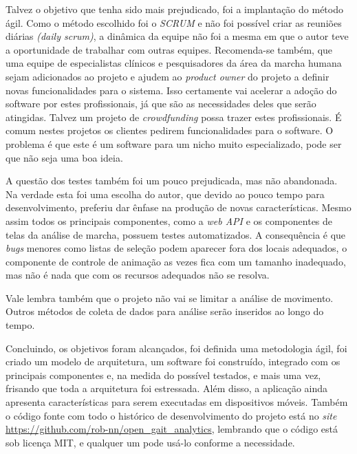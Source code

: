 Talvez o objetivo que tenha sido mais prejudicado, foi a implantação do método ágil. 
Como o método escolhido foi o \emph{SCRUM} e não foi possível criar as reuniões diárias \emph{(daily scrum)}, a dinâmica da equipe não foi a mesma em que o autor teve a oportunidade de trabalhar com outras equipes.
Recomenda-se também, que uma equipe de especialistas clínicos e pesquisadores da área da marcha humana sejam adicionados ao projeto e ajudem ao \emph{product owner} do projeto a definir novas funcionalidades para o sistema. 
Isso certamente vai acelerar a adoção do software por estes profissionais, já que são as necessidades deles que serão atingidas.
Talvez um projeto de \emph{crowdfunding} possa trazer estes profissionais. 
É comum nestes projetos os clientes pedirem funcionalidades para o software.
O problema é que este é um software para um nicho muito especializado, pode ser que não seja uma boa ideia.


A questão dos testes também foi um pouco prejudicada, mas não abandonada. Na verdade esta foi uma escolha do autor, que devido ao pouco tempo para desenvolvimento, preferiu dar ênfase na produção de novas características. Mesmo assim todos os principais componentes, como a \emph{web API} e os componentes de telas da análise de marcha, possuem testes automatizados.
A consequência é que \emph{bugs} menores como listas de seleção podem aparecer fora dos locais adequados, o componente de controle de animação as vezes fica com um tamanho inadequado, mas não é nada que com os recursos adequados não se resolva.

Vale lembra também que o projeto não vai se limitar a análise de movimento. Outros métodos de coleta de dados para análise serão inseridos ao longo do tempo.


Concluindo, os objetivos foram alcançados, foi definida uma metodologia ágil, foi criado um modelo de arquitetura, um software foi construído, integrado com os principais componentes e, na medida do possível testados, e mais uma vez, frisando que toda a arquitetura foi estressada. 
Além disso, a aplicação ainda apresenta características para serem executadas em dispositivos móveis. 
Também o código fonte com todo o histórico de desenvolvimento do projeto está no \emph{site} \url{https://github.com/rob-nn/open\_gait\_analytics}, lembrando que o código está sob licença MIT, e qualquer um pode usá-lo conforme a necessidade.
